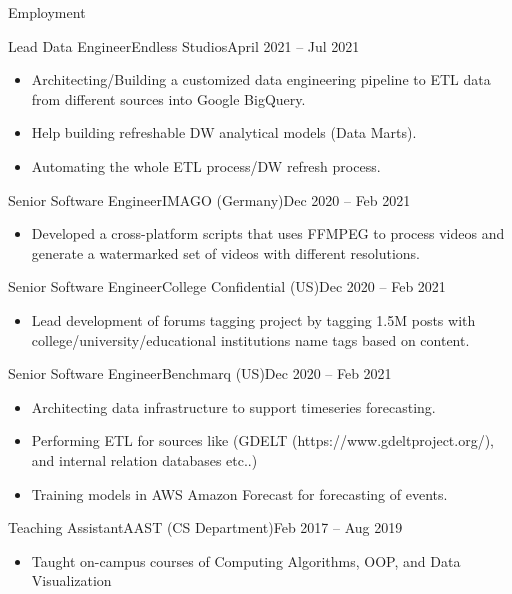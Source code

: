 \documentclass[]{ahmedamrcv_saudi}
\begin{document}
\begin{cvsection}{Employment}
		\begin{cvsubsection}{Lead Data Engineer}{Endless Studios}{April 2021 -- Jul 2021}	
			\begin{itemize}
				\item Architecting/Building a customized data engineering pipeline to ETL data from different sources into Google BigQuery.
				\item Help building refreshable DW analytical models (Data Marts).
				\item Automating the whole ETL process/DW refresh process.
			\end{itemize}
		\end{cvsubsection}

		\begin{cvsubsection}{Senior Software Engineer}{IMAGO (Germany)}{Dec 2020 -- Feb 2021}	
			\begin{itemize}
				\item Developed a cross-platform scripts that uses FFMPEG to process videos and generate a watermarked set of videos with different resolutions.
			\end{itemize}
		\end{cvsubsection}

		\begin{cvsubsection}{Senior Software Engineer}{College Confidential (US)}{Dec 2020 -- Feb 2021}	
			\begin{itemize}
				\item Lead development of forums tagging project by tagging 1.5M posts with college/university/educational institutions name tags based on content.
			\end{itemize}
		\end{cvsubsection}

		\begin{cvsubsection}{Senior Software Engineer}{Benchmarq (US)}{Dec 2020 -- Feb 2021}	
			\begin{itemize}
				\item Architecting data infrastructure to support timeseries forecasting.
				\item Performing ETL for sources like (GDELT (https://www.gdeltproject.org/), and internal relation databases etc..)
				\item Training models in AWS Amazon Forecast for forecasting of events.
			\end{itemize}
		\end{cvsubsection}
		
		\begin{cvsubsection}{Teaching Assistant}{AAST (CS Department)}{Feb 2017 -- Aug 2019}
			\begin{itemize}
				\item Taught on-campus courses of Computing Algorithms, OOP, and Data Visualization
			\end{itemize}
		\end{cvsubsection}
		

\end{cvsection}
\end{document}
